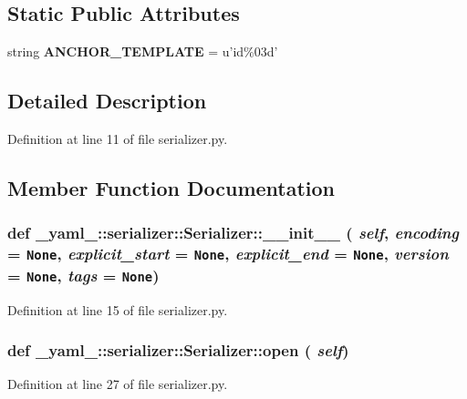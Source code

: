 \subsection*{Static Public Attributes}
\begin{CompactItemize}
\item 
string {\bf ANCHOR\_\-TEMPLATE} = u'id\%03d'
\end{CompactItemize}


\subsection{Detailed Description}


Definition at line 11 of file serializer.py.

\subsection{Member Function Documentation}
\subsubsection{\setlength{\rightskip}{0pt plus 5cm}def \_\-yaml\_\-::serializer::Serializer::\_\-\_\-init\_\-\_\- ( {\em self},  {\em encoding} = {\tt None},  {\em explicit\_\-start} = {\tt None},  {\em explicit\_\-end} = {\tt None},  {\em version} = {\tt None},  {\em tags} = {\tt None})}\label{class__yaml___1_1serializer_1_1Serializer_9e540cc62759b0089697a9a3512e0f56}




Definition at line 15 of file serializer.py.
\subsubsection{\setlength{\rightskip}{0pt plus 5cm}def \_\-yaml\_\-::serializer::Serializer::open ( {\em self})}\label{class__yaml___1_1serializer_1_1Serializer_530c11d4d1ca4f8a7bafdd5f0222ed1d}




Definition at line 27 of file serializer.py.
